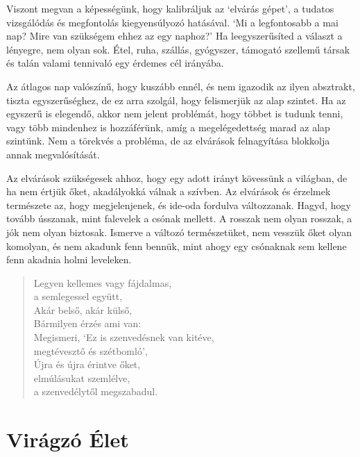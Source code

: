 
Viszont megvan a képességünk, hogy kalibráljuk az `elvárás gépet', a
tudatos vizsgálódás és megfontolás kiegyensúlyozó hatásával. `Mi a
legfontosabb a mai nap? Mire van szükségem ehhez az egy naphoz?' Ha
leegyszerűsíted a választ a lényegre, nem olyan sok. Étel, ruha,
szállás, gyógyszer, támogató szellemű társak és talán valami tennivaló
egy érdemes cél irányába.

Az átlagos nap valószínű, hogy kuszább ennél, és nem igazodik az ilyen
absztrakt, tiszta egyszerűséghez, de ez arra szolgál, hogy felismerjük
az alap szintet. Ha az egyszerű is elegendő, akkor nem jelent problémát,
hogy többet is tudunk tenni, vagy több mindenhez is hozzáférünk, amíg a
megelégedettség marad az alap szintünk. Nem a törekvés a probléma, de az
elvárások felnagyítása blokkolja annak megvalósítását.

Az elvárások szükségesek ahhoz, hogy egy adott irányt kövessünk a
világban, de ha nem értjük őket, akadályokká válnak a szívben. Az
elvárások és érzelmek természete az, hogy megjelenjenek, és ide-oda
fordulva változzanak. Hagyd, hogy tovább ússzanak, mint falevelek a
csónak mellett. A rosszak nem olyan rosszak, a jók nem olyan biztosak.
Ismerve a változó természetüket, nem vesszük őket olyan komolyan, és nem
akadunk fenn bennük, mint ahogy egy csónaknak sem kellene fenn akadnia
holmi leveleken.

\begin{quote}
Legyen kellemes vagy fájdalmas,\\
a semlegessel együtt,\\
Akár belső, akár külső,\\
Bármilyen érzés ami van:\\
Megismeri, `Ez is szenvedésnek van kitéve,\\
megtévesztő és szétbomló',\\
Újra és újra érintve őket,\\
elmúlásukat szemlélve,\\
a szenvedélytől megszabadul.

\bigskip

\end{quote}

\clearpage

\section{Virágzó Élet}

